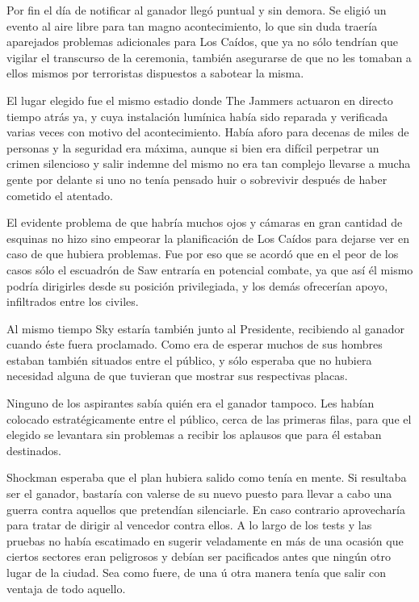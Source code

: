 Por fin el día de notificar al ganador llegó puntual y sin demora. Se eligió un evento al aire libre para tan magno acontecimiento, lo que sin duda traería aparejados problemas adicionales para Los Caídos, que ya no sólo tendrían que vigilar el transcurso de la ceremonia, también asegurarse de que no les tomaban a ellos mismos por terroristas dispuestos a sabotear la misma.

El lugar elegido fue el mismo estadio donde The Jammers actuaron en directo tiempo atrás ya, y cuya instalación lumínica había sido reparada y verificada varias veces con motivo del acontecimiento. Había aforo para decenas de miles de personas y la seguridad era máxima, aunque si bien era difícil perpetrar un crimen silencioso y salir indemne del mismo no era tan complejo llevarse a mucha gente por delante si uno no tenía pensado huir o sobrevivir después de haber cometido el atentado.

El evidente problema de que habría muchos ojos y cámaras en gran cantidad de esquinas no hizo sino empeorar la planificación de Los Caídos para dejarse ver en caso de que hubiera problemas. Fue por eso que se acordó que en el peor de los casos sólo el escuadrón de Saw entraría en potencial combate, ya que así él mismo podría dirigirles desde su posición privilegiada, y los demás ofrecerían apoyo, infiltrados entre los civiles.

Al mismo tiempo Sky estaría también junto al Presidente, recibiendo al ganador cuando éste fuera proclamado. Como era de esperar muchos de sus hombres estaban también situados entre el público, y sólo esperaba que no hubiera necesidad alguna de que tuvieran que mostrar sus respectivas placas.

Ninguno de los aspirantes sabía quién era el ganador tampoco. Les habían colocado estratégicamente entre el público, cerca de las primeras filas, para que el elegido se levantara sin problemas a recibir los aplausos que para él estaban destinados.

Shockman esperaba que el plan hubiera salido como tenía en mente. Si resultaba ser el ganador, bastaría con valerse de su nuevo puesto para llevar a cabo una guerra contra aquellos que pretendían silenciarle. En caso contrario aprovecharía para tratar de dirigir al vencedor contra ellos. A lo largo de los tests y las pruebas no había escatimado en sugerir veladamente en más de una ocasión que ciertos sectores eran peligrosos y debían ser pacificados antes que ningún otro lugar de la ciudad. Sea como fuere, de una ú otra manera tenía que salir con ventaja de todo aquello.

